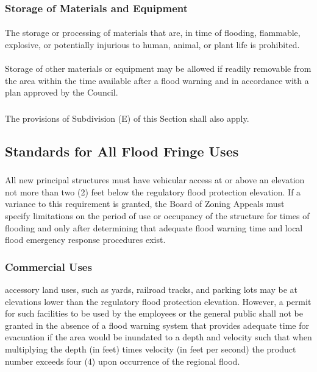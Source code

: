 \subsubsection{Storage of Materials and Equipment}
\paragraph{}
The storage or processing of materials that are, in time of flooding, flammable, explosive, or potentially injurious to human, animal, or plant life is prohibited.
\paragraph{}
Storage of other materials or equipment may be allowed if readily removable from the area within the time available after a flood warning and in accordance with a plan approved by the Council.
\subsubsection{}
The provisions of Subdivision (E) of this Section shall also apply.
\subsection{Standards for All Flood Fringe Uses}
\subsubsection{}
All new principal structures must have vehicular access at or above an elevation not more than two (2) feet below the regulatory flood protection elevation. If a variance to this requirement is granted, the Board of Zoning Appeals must specify limitations on the period of use or occupancy of the structure for times of flooding and only after determining that adequate flood warning time and local flood emergency response procedures exist.
\subsubsection{Commercial Uses}
accessory land uses, such as yards, railroad tracks, and parking lots may be at elevations lower than the regulatory flood protection elevation. However, a permit for such facilities to be used by the employees or the general public shall not be granted in the absence of a flood warning system that provides adequate time for evacuation if the area would be inundated to a depth and velocity such that when multiplying the depth (in feet) times velocity (in feet per second) the product number exceeds four (4) upon occurrence of the regional flood.
